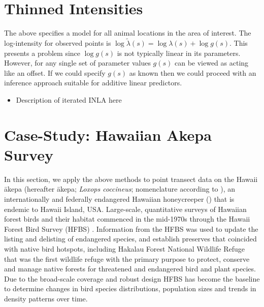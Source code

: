\documentclass[preprint,12pt]{elsarticle}
\newcommand{\tl}{\tilde{\lambda}}   %
\newcommand{\akepa}{\textquotesingle\={a}kepa}  %
\newcommand{\hawaii}{Hawai\textquotesingle i}   %
\begin{document}
\section*{Thinned Intensities}

The above specifies a model for all animal locations in the area of interest.  The log-intensity for observed points is $\log\tl(s) = \log\lambda(s) + \log g(s)$.  This presents a problem since $\log g(s)$ is not typically linear in its parameters. However, for any single set of parameter values $g(s)$ can be viewed as acting like an offset. If we could specify $g(s)$ as known then we could proceed with an inference approach suitable for additive linear predictors.

\begin{itemize}
 \item Description of iterated INLA here
\end{itemize}

\section*{Case-Study:  Hawaiian Akepa Survey}


\bigskip

In this section, we apply the above methods to point transect data on the \hawaii{} \akepa{} (hereafter \akepa{}; \textit{Loxops coccineus}; nomenclature according to \citealp{usfws_akepa_1970}), an internationally and federally endangered Hawaiian honeycreeper (\citealp{usfws_akepa_1970, birdlife_akepa_2016}) that is endemic to \hawaii{} Island, USA.  Large-scale, quantitative surveys of Hawaiian forest birds and their habitat commenced in the mid-1970s through the Hawaii Forest Bird Survey (HFBS) \citep{scott_HFBS_1986}. Information from the HFBS was used to update the listing and delisting of endangered species, and establish preserves that coincided with native bird hotspots, including Hakalau Forest National Wildlife Refuge that was the first wildlife refuge with the primary purpose to protect, conserve and manage native forests for threatened and endangered bird and plant species. Due to the broad-scale coverage and robust design HFBS has become the baseline to determine changes in bird species distributions, population sizes and trends in density patterns over time.
\end{document}
